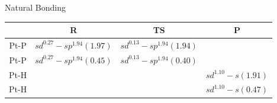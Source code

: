 \documentclass[10pt,aspectratio=43,mathserif]{beamer}
\begin{document}
\begin{frame}
Natural Bonding
\begin{table}
	\centering
	\begin{tabular}{c|ccc}
		\hline
		& R & TS & P \\ \hline
		Pt-P & $ sd^{0.27}-sp^{1.94}(1.97) $ &  $ sd^{0.13}-sp^{1.94}(1.94) $ & \\	
		Pt-P & $ sd^{0.27}-sp^{1.94}(0.45) $ &  $ sd^{0.13}-sp^{1.94}(0.40) $ & \\
		Pt-H & & & $ sd^{1.10}-s(1.91) $ \\
		Pt-H & & & $ sd^{1.10}-s(0.47) $ \\
		\hline
	\end{tabular}
\end{table}



\end{frame}


%
%
\end{document}
